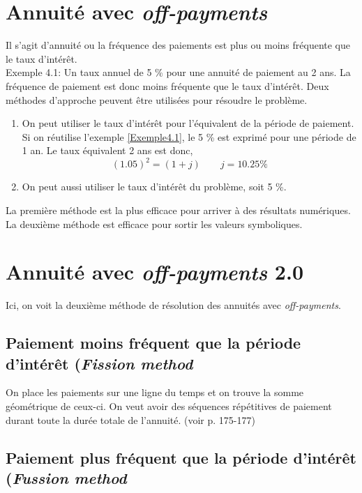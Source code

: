 \documentclass[11pt,french]{report}
\begin{document}
\section{Annuité avec \emph{off-payments}}
\label{Annuité off-payments 1.0}
Il s'agit d'annuité ou la fréquence des paiements est plus ou moins fréquente que le taux d'intérêt. 
\\Exemple 4.1\label{Exemple4.1}: Un taux annuel de 5 \% pour une annuité de paiement au 2 ans. La fréquence de paiement est donc moins fréquente que le taux d'intérêt. Deux méthodes d'approche peuvent être utilisées pour résoudre le problème.

\begin{enumerate}
\item On peut utiliser le taux d'intérêt pour l'équivalent de la période de paiement. Si on réutilise l'exemple \ref{Exemple4.1}, le 5 \% est exprimé pour une période de 1 an. Le taux équivalent 2 ans est donc, 
\begin{equation}
(1.05)^2 = (1 + j) \qquad j = 10.25 \%
\end{equation}
\item On peut aussi utiliser le taux d'intérêt du problème, soit 5 \%.
\end{enumerate}
La première méthode est la plus efficace pour arriver à des résultats numériques. La deuxième méthode est efficace pour sortir les valeurs symboliques.

\section{Annuité avec \emph{off-payments} 2.0}
\label{Annuité off-payments 2.0}

Ici, on voit la deuxième méthode de résolution des annuités avec \emph{off-payments}.

\subsection{Paiement moins fréquent que la période d'intérêt (\emph{Fission method}}
\label{fission method}

On place les paiements sur une ligne du temps et on trouve la somme géométrique de ceux-ci. On veut avoir des séquences répétitives de paiement durant toute la durée totale de l'annuité. (voir p. 175-177)

\subsection{Paiement plus fréquent que la période d'intérêt (\emph{Fussion method}}
\label{Fussion method}
\end{document}
